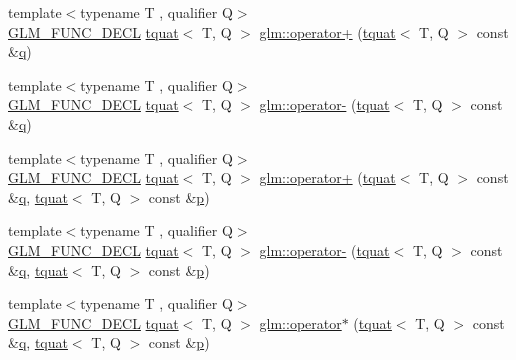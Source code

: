 \begin{DoxyCompactItemize}
\item 
{\footnotesize template$<$typename T , qualifier Q$>$ }\\\hyperlink{setup_8hpp_ab2d052de21a70539923e9bcbf6e83a51}{G\+L\+M\+\_\+\+F\+U\+N\+C\+\_\+\+D\+E\+CL} \hyperlink{structglm_1_1tquat}{tquat}$<$ T, Q $>$ \hyperlink{group__gtc__quaternion_ga415c33d49346428f93089f80cf8f9187}{glm\+::operator+} (\hyperlink{structglm_1_1tquat}{tquat}$<$ T, Q $>$ const \&\hyperlink{_s_d_l__opengl_8h_a8fc1e7b9baaae687804c7eed46ca09c6}{q})
\item 
{\footnotesize template$<$typename T , qualifier Q$>$ }\\\hyperlink{setup_8hpp_ab2d052de21a70539923e9bcbf6e83a51}{G\+L\+M\+\_\+\+F\+U\+N\+C\+\_\+\+D\+E\+CL} \hyperlink{structglm_1_1tquat}{tquat}$<$ T, Q $>$ \hyperlink{group__gtc__quaternion_ga594339bbf8d9d11ec27ada0502d4eeaf}{glm\+::operator-\/} (\hyperlink{structglm_1_1tquat}{tquat}$<$ T, Q $>$ const \&\hyperlink{_s_d_l__opengl_8h_a8fc1e7b9baaae687804c7eed46ca09c6}{q})
\item 
{\footnotesize template$<$typename T , qualifier Q$>$ }\\\hyperlink{setup_8hpp_ab2d052de21a70539923e9bcbf6e83a51}{G\+L\+M\+\_\+\+F\+U\+N\+C\+\_\+\+D\+E\+CL} \hyperlink{structglm_1_1tquat}{tquat}$<$ T, Q $>$ \hyperlink{group__gtc__quaternion_ga90911b1428a0a773fa9e0c0952ce25fd}{glm\+::operator+} (\hyperlink{structglm_1_1tquat}{tquat}$<$ T, Q $>$ const \&\hyperlink{_s_d_l__opengl_8h_a8fc1e7b9baaae687804c7eed46ca09c6}{q}, \hyperlink{structglm_1_1tquat}{tquat}$<$ T, Q $>$ const \&\hyperlink{_s_d_l__opengl__glext_8h_aa5367c14d90f462230c2611b81b41d23}{p})
\item 
{\footnotesize template$<$typename T , qualifier Q$>$ }\\\hyperlink{setup_8hpp_ab2d052de21a70539923e9bcbf6e83a51}{G\+L\+M\+\_\+\+F\+U\+N\+C\+\_\+\+D\+E\+CL} \hyperlink{structglm_1_1tquat}{tquat}$<$ T, Q $>$ \hyperlink{group__gtc__quaternion_ga004ef8d57d8c50ec4356e2b8a43e93af}{glm\+::operator-\/} (\hyperlink{structglm_1_1tquat}{tquat}$<$ T, Q $>$ const \&\hyperlink{_s_d_l__opengl_8h_a8fc1e7b9baaae687804c7eed46ca09c6}{q}, \hyperlink{structglm_1_1tquat}{tquat}$<$ T, Q $>$ const \&\hyperlink{_s_d_l__opengl__glext_8h_aa5367c14d90f462230c2611b81b41d23}{p})
\item 
{\footnotesize template$<$typename T , qualifier Q$>$ }\\\hyperlink{setup_8hpp_ab2d052de21a70539923e9bcbf6e83a51}{G\+L\+M\+\_\+\+F\+U\+N\+C\+\_\+\+D\+E\+CL} \hyperlink{structglm_1_1tquat}{tquat}$<$ T, Q $>$ \hyperlink{group__gtc__quaternion_ga447cda99bd10c12696177d490049a8f5}{glm\+::operator$\ast$} (\hyperlink{structglm_1_1tquat}{tquat}$<$ T, Q $>$ const \&\hyperlink{_s_d_l__opengl_8h_a8fc1e7b9baaae687804c7eed46ca09c6}{q}, \hyperlink{structglm_1_1tquat}{tquat}$<$ T, Q $>$ const \&\hyperlink{_s_d_l__opengl__glext_8h_aa5367c14d90f462230c2611b81b41d23}{p})

\end{DoxyCompactItemize}
